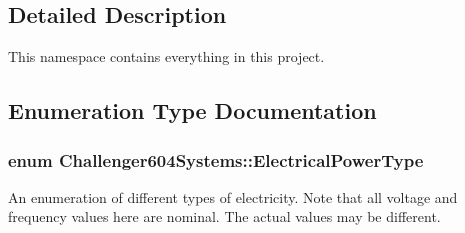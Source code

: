 \subsection{Detailed Description}
This namespace contains everything in this project. 

\subsection{Enumeration Type Documentation}
\hypertarget{namespace_challenger604_systems_a9ad1a793d94b97514092692cb7315afd}{
\subsubsection[{Electrical\-Power\-Type}]{\setlength{\rightskip}{0pt plus 5cm}enum {\bf Challenger604\-Systems\-::\-Electrical\-Power\-Type}}}\label{namespace_challenger604_systems_a9ad1a793d94b97514092692cb7315afd}


An enumeration of different types of electricity. Note that all voltage and frequency values here are nominal. The actual values may be different. 

